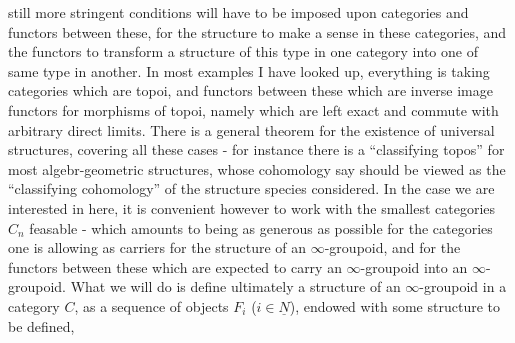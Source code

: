  still  more stringent conditions will have to be imposed upon categories and functors between these, for the structure to make a sense in  these categories, and the functors to transform a structure of this type in one category into one of same type in another. In most examples I have looked up, everything is  taking categories which are topoi, and functors between these which are inverse image functors for morphisms of topoi, namely which are left exact and commute with arbitrary direct limits. There is a general theorem for the existence of universal structures, covering all these cases - for instance there is a ``classifying topos'' for most algebr-geometric structures, whose cohomology say should be viewed as the ``classifying cohomology'' of the structure species considered. In the case we are interested in here, it is convenient however to work with the smallest categories $C_n$ feasable - which amounts to being as generous as possible for the categories  one is allowing as carriers for the structure of an $\infty$-groupoid, and for the functors between these which are expected to carry an $\infty$-groupoid into an $\infty$-groupoid. What we will do is define ultimately a structure of an $\infty$-groupoid in a category $C$, as a sequence of objects $F_i$ ($i\in\underline{N}$), endowed with some structure to be defined,
